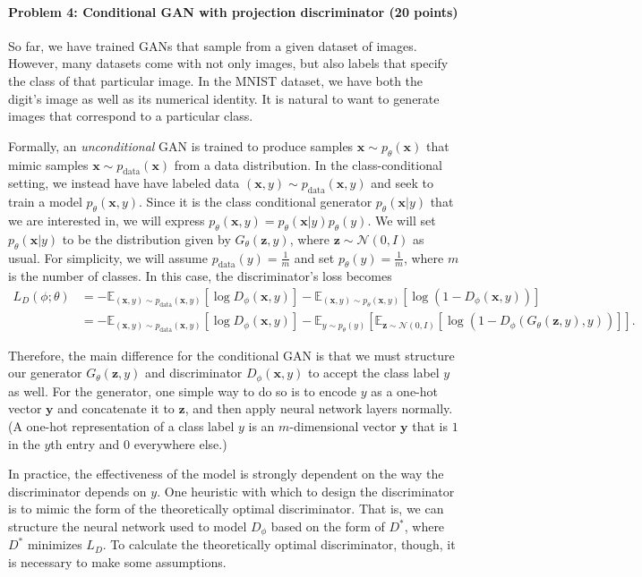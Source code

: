 \documentclass{article}
\newcommand{\bx}{{\boldsymbol{x}}}
\newcommand{\by}{{\boldsymbol{y}}}
\newcommand{\bz}{{\boldsymbol{z}}}
\begin{document}
\paragraph{Problem 4: Conditional GAN with projection discriminator (20 points) \\}

So far, we have trained GANs that sample from a given dataset of images. However, many datasets come with not only images, but also labels that specify the class of that particular image. In the MNIST dataset, we have both the digit's image as well as its numerical identity. It is natural to want to generate images that correspond to a particular class. 

Formally, an \textit{unconditional} GAN is trained to produce samples $\bx \sim p_\theta(\bx)$ that mimic samples $\bx \sim p_\text{data}(\bx)$ from a data distribution. In the class-conditional setting, we instead have have labeled data $(\bx,y) \sim p_\text{data}(\bx,y)$ and seek to train a model $p_\theta(\bx,y)$. Since it is the class conditional generator $p_\theta(\bx|y)$ that we are interested in, we will express $p_\theta(\bx,y) = p_\theta(\bx|y) p_\theta(y)$. We will set $p_\theta(\bx|y)$ to be the distribution given by $G_\theta(\bz,y)$, where $\bz \sim \mathcal{N}(0,I)$ as usual. For simplicity, we will assume $p_{\text{data}}(y) = \frac{1}{m}$ and set $p_\theta(y) = \frac{1}{m}$, where $m$ is the number of classes. In this case, the discriminator's loss becomes 
\begin{align*}
    L_D(\phi; \theta) 
        &= -\mathbb{E}_{(\bx,y)\sim p_\text{data}(\bx,y)} [ \log D_\phi(\bx,y) ] - \mathbb{E}_{(\bx,y) \sim p_\theta(\bx,y)}[\log(1 - D_\phi(\bx,y))] \\
        &= -\mathbb{E}_{(\bx,y)\sim p_\text{data}(\bx,y)} [ \log D_\phi(\bx,y) ] - \mathbb{E}_{y \sim p_\theta(y)}[ \mathbb{E}_{\bz \sim \mathcal{N}(0,I)} [\log(1 - D_\phi(G_\theta(\bz,y),y))]].
\end{align*}

Therefore, the main difference for the conditional GAN is that we must structure our generator $G_\theta(\bz,y)$ and discriminator $D_\phi(\bx,y)$  to accept the class label $y$ as well. For the generator, one simple way to do so is to encode $y$ as a one-hot vector $\by$ and concatenate it to $\bz$, and then apply neural network layers normally. (A one-hot representation of a class label $y$ is an $m$-dimensional vector $\by$ that is $1$ in the $y$th entry and $0$ everywhere else.)

In practice, the effectiveness of the model is strongly dependent on the way the discriminator depends on $y$. One heuristic with which to design the discriminator is to mimic the form of the theoretically optimal discriminator. That is, we can structure the neural network used to model $D_\phi$ based on the form of $D^*$, where $D^*$ minimizes $L_D$. To calculate the theoretically optimal discriminator, though, it is necessary to make some assumptions.
    
\end{document}
